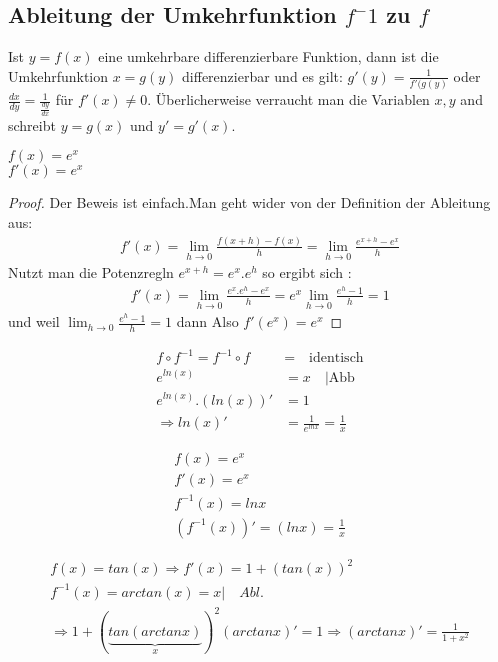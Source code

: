 \subsection{Ableitung der Umkehrfunktion $f^-1$ zu $f$ }
\begin{definition}
Ist $ y = f(x) $ eine umkehrbare differenzierbare Funktion, dann ist die Umkehrfunktion $ x = g(y)$ differenzierbar und es gilt: 
$g'(y)= \frac{1}{f'(g(y)}$ oder $\frac{dx}{dy}= \frac{1}{\frac{dy}{dx}}$ für $f'(x)\neq 0$.
Überlicherweise verraucht man die Variablen $x , y$ and schreibt $y = g(x)$ und $y'=g'(x)$. 
\end{definition}

\begin{example}
$f(x)=e^x$\\
$f'(x)=e^x$\\

\begin{proof}
Der Beweis ist einfach.Man geht wider von der Definition der Ableitung aus:
\begin{align*}
f'(x)= \lim_{h \to 0}{\frac{f(x+h)-f(x)}{h}}= \lim_{h \to 0}{\frac{e^{x+h}-e^x}{h}}
\end{align*}
Nutzt man die Potenzregln $e^{x+h}=e^x.e^h$ so ergibt sich : 
\begin{align*}
f'(x)= \lim_{h \to 0}{\frac{e^x.e^h-e^x}{h}}=e^x \lim_{h \to 0}{\frac{e^h-1}{h}}=1
\end{align*}
und weil $\lim_{h \to 0}{\frac{e^h-1}{h}}=1$ dann Also $f'(e^x)=e^x$
\end{proof}
\end{example}

\begin{remark}
\begin{align*}
f \circ f^{-1} = f^{-1} \circ f &= \quad \text{identisch}\\
e^{ln(x)} &= x \quad | \text{Abb} \\
e^{ln(x)}.(ln(x))' &= 1\\
\Rightarrow ln(x)'&= \frac{1}{e^{lnx}}= \frac{1}{x}
\end{align*}
\end{remark}

\begin{example}
\begin{align*}
f(x)=e^x\\
f'(x)=e^x\\
f^{-1}(x)=lnx\\
(f^{-1}(x))'=(lnx)=\frac{1}{x}
\end{align*}
\end{example}

\begin{example}
\begin{gather*}
f(x) = tan(x) \Rightarrow f'(x) = 1+(tan(x))^2\\
f^{-1}(x)= arctan(x) = x  | \quad Abl.\\
\Rightarrow 1 + ( \underbrace{tan(arctan x)}_{x})^2(arctanx)' = 1 \Rightarrow (arctanx)'=\frac{1}{1+x^2}
\end{gather*}
\end{example}


